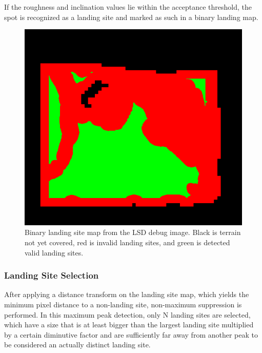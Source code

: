 \documentclass{article}
\begin{document}
If the roughness and inclination values lie within the acceptance threshold, the spot is recognized as a landing site and marked as such in a binary landing map. 

\begin{figure}[ht!]
    \centering
    \includegraphics[scale=0.5]{images/system_overview/landing_map.png}
    \caption{Binary landing site map from the LSD debug image. Black is terrain not yet covered, red is invalid landing sites, and green is detected valid landing sites.}
    \label{fig:ls_map}
\end{figure}

\subsubsection{Landing Site Selection}\label{subsubsec:setup:ls_select}

After applying a distance transform on the landing site map, which yields the minimum pixel distance to a non-landing site, non-maximum suppression is performed. In this maximum peak detection, only N landing sites are selected, which have a size that is at least bigger than the largest landing site multiplied by a certain diminutive factor and are sufficiently far away from another peak to be considered an actually distinct landing site.
\end{document}
